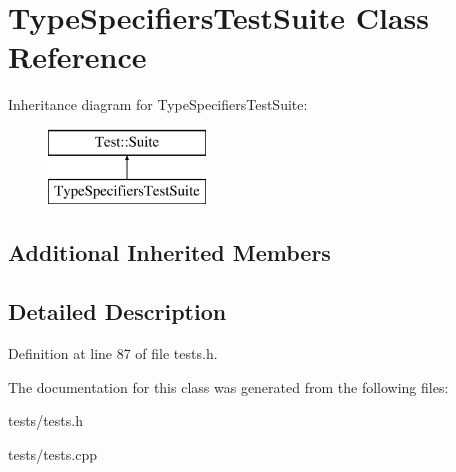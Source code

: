 \hypertarget{class_type_specifiers_test_suite}{}\section{Type\+Specifiers\+Test\+Suite Class Reference}
\label{class_type_specifiers_test_suite}
Inheritance diagram for Type\+Specifiers\+Test\+Suite\+:\begin{figure}[H]
\begin{center}
\leavevmode
\includegraphics[height=2.000000cm]{class_type_specifiers_test_suite}
\end{center}
\end{figure}
\subsection*{Additional Inherited Members}


\subsection{Detailed Description}


Definition at line 87 of file tests.\+h.



The documentation for this class was generated from the following files\+:\begin{DoxyCompactItemize}
\item 
tests/tests.\+h\item 
tests/tests.\+cpp\end{DoxyCompactItemize}
